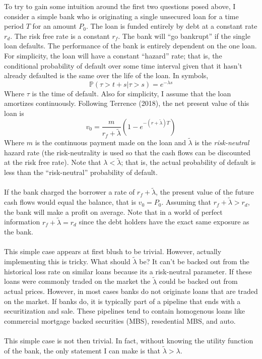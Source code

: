 \documentclass{article}
\begin{document}
To try to gain some intuition around the first two questions posed above, I consider a simple bank who is originating a single unsecured loan for a time period \(T\) for an amount \(P_0\).  The loan is funded entirely by debt at a constant rate \(r_d\).  The risk free rate is a constant \(r_f\).  The bank will ``go bankrupt'' if the single loan defaults.  The performance of the bank is entirely dependent on the one loan.  For simplicity, the loan will have a constant ``hazard'' rate; that is, the conditional probability of default over some time interval given that it hasn't already defaulted is the same over the life of the loan.  In symbols, 
\[\mathbb{P}(\tau>t+s|\tau>s)=e^{-\lambda s}\]
Where \(\tau\) is the time of default.  Also for simplicity, I assume that the loan amortizes continuously.  Following Terrence (2018), the net present value of this loan is 
\[v_0= \frac{m}{r_f+\tilde{\lambda}}\left(1-e^{-(r+\tilde{\lambda})T}\right)\]
Where \(m\) is the continuous payment made on the loan and \(\tilde{\lambda}\) is the \emph{risk-neutral} hazard rate (the risk-neutrality is used so that the cash flows can be discounted at the risk free rate).  Note that \(\lambda<\tilde{\lambda}\); that is, the actual probability of default is less than the ``risk-neutral'' probability of default.  
\\
\\
If the bank charged the borrower a rate of \(r_f+\tilde{\lambda}\), the present value of the future cash flows would equal the balance, that is \(v_0=P_0\).  Assuming that \(r_f+\tilde{\lambda}>r_d\), the bank will make a profit on average.  Note that in a world of perfect information \(r_f+\tilde{\lambda}=r_d\) since the debt holders have the exact same exposure as the bank.  
\\
\\
This simple case appears at first blush to be trivial.  However, actually implementing this is tricky.  What should \(\tilde{\lambda}\) be?  It can't be backed out from the historical loss rate on similar loans because its a risk-neutral parameter.  If these loans were commonly traded on the market the \(\tilde{\lambda}\) could be backed out from actual prices.  However, in most cases banks do not originate loans that are traded on the market.  If banks do, it is typically part of a pipeline that ends with a securitization and sale.  These pipelines tend to contain homogenous loans like commercial mortgage backed securities (MBS), resedential MBS, and auto.  
\\
\\
This simple case is not then trivial.  In fact, without knowing the utility function of the bank, the only statement I can make is that \(\tilde{\lambda}>\lambda\).
\end{document}
